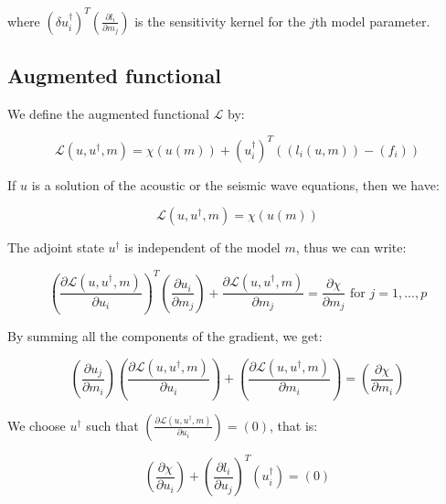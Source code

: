 \documentclass{article}
\begin{document}
where $\left( \delta u_i^{\dagger} \right) ^{T} \left( \frac{\partial l_i}{\partial m_j} \right)$ is the sensitivity kernel for the $j$th model parameter.

\subsection{Augmented functional}

We define the augmented functional $\mathscr{L}$ by:

\begin{equation}
	\mathscr{L} (u, u^{\dagger}, m) = \chi (u(m)) + \left( u_i^{\dagger} \right) ^{T} \left( \left( l_i (u, m) \right) - \left( f_i \right) \right)
\end{equation}

If $u$ is a solution of the acoustic or the seismic wave equations, then we have:

\begin{equation}
	\mathscr{L} (u, u^{\dagger}, m) = \chi (u(m))
\end{equation}

The adjoint state $u^{\dagger}$ is independent of the model $m$, thus we can write:

\begin{equation}
	\left( \frac{\partial \mathscr{L} (u, u^{\dagger}, m)}{\partial u_i} \right) ^{T} \left( \frac{\partial u_i}{\partial m_j} \right) + \frac{\partial \mathscr{L} (u, u^{\dagger}, m)}{\partial m_j} = \frac{\partial \chi}{\partial m_j} \text{ for } j = 1 , ... , p
\end{equation}

By summing all the components of the gradient, we get:

\begin{equation}
	\left( \frac{\partial u_j}{\partial m_i} \right) \left( \frac{\partial \mathscr{L} (u, u^{\dagger}, m)}{\partial u_i} \right) + \left( \frac{\partial \mathscr{L} (u, u^{\dagger}, m)}{\partial m_i} \right) = \left( \frac{\partial \chi}{\partial m_i} \right)
\end{equation}

We choose $u^{\dagger}$ such that $\left( \frac{\partial \mathscr{L} (u, u^{\dagger}, m)}{\partial u_i} \right) = \left( 0 \right)$, that is:

\begin{equation}
	\left( \frac{\partial \chi}{\partial u_i} \right) + \left( \frac{\partial l_i}{\partial u_j} \right) ^{T} \left( u_i^{\dagger} \right) = \left( 0 \right)
\end{equation}
\end{document}
